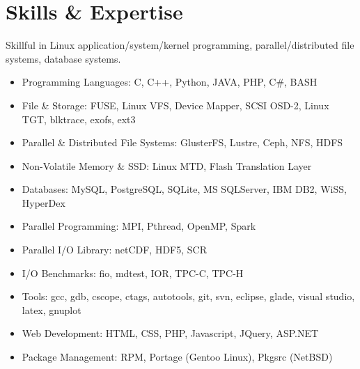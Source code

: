 \section{Skills \& Expertise}
Skillful in Linux application/system/kernel programming, parallel/distributed file systems, database systems.
\begin{itemize}
\item {Programming Languages}: C, C++, Python, JAVA, PHP, C\#, BASH
\item {File \& Storage}: FUSE, Linux VFS, Device Mapper, SCSI OSD-2, Linux TGT, blktrace, exofs, ext3
\item {Parallel \& Distributed File Systems}: GlusterFS, Lustre, Ceph, NFS, HDFS
\item {Non-Volatile Memory \& SSD}: Linux MTD, Flash Translation Layer
\item {Databases}: MySQL, PostgreSQL, SQLite, MS SQLServer, IBM DB2, WiSS, HyperDex
\item {Parallel Programming}: MPI, Pthread, OpenMP, Spark
\item {Parallel I/O Library}: netCDF, HDF5, SCR
\item {I/O Benchmarks}: fio, mdtest, IOR, TPC-C, TPC-H
\item {Tools}: gcc, gdb, cscope, ctags, autotools, git, svn, eclipse, glade, visual studio, latex, gnuplot
\item {Web Development}: HTML, CSS, PHP, Javascript, JQuery, ASP.NET
\item {Package Management}: RPM, Portage (Gentoo Linux), Pkgsrc (NetBSD)
\end{itemize}

